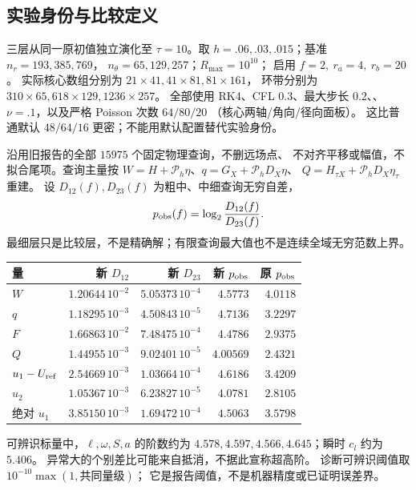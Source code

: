 \documentclass[UTF8,fontset=fandol,11pt,a4paper]{ctexart}
\newcommand{\code}[1]{\texttt{\detokenize{#1}}}
\newcommand{\Dx}{D_X}
\begin{document}
\subsection{实验身份与比较定义}
三层从同一原初值独立演化至 $\tau=10$。取
$h=.06,.03,.015$；基准 $n_r=193,385,769$，
$n_\theta=65,129,257$；$R_{\max}=10^{10}$；
启用 $f=2,\ r_a=4,\ r_b=20$。
实际核心数组分别为 $21\times41,41\times81,81\times161$，
环带分别为 $310\times65,618\times129,1236\times257$。
全部使用 RK4、CFL $0.3$、最大步长 $0.2$、\code{linear5}、
$\nu=.1$，以及严格 Poisson 次数 $64/80/20$
（核心两轴/角向/径向面板）。
这比普通默认 $48/64/16$ 更密；不能用默认配置替代实验身份。

沿用旧报告的全部 $15975$ 个固定物理查询，不删远场点、
不对齐平移或幅值，不拟合尾项。查询主量按
$W=H+\mathcal P_h\eta$、$q=G_X+\mathcal P_h\Dx\eta$、
$Q=H_{\tau X}+\mathcal P_h\Dx\eta_\tau$ 重建。
设 $D_{12}(f),D_{23}(f)$ 为粗中、中细查询无穷自差，
\begin{equation}
 p_{\rm obs}(f)=\log_2\frac{D_{12}(f)}{D_{23}(f)}.
\end{equation}
最细层只是比较层，不是精确解；有限查询最大值也不是连续全域无穷范数上界。

\begin{center}
\small
\begin{tabular}{lrrrr}
\toprule
量 & 新 $D_{12}$ & 新 $D_{23}$ & 新 $p_{\rm obs}$ & 原 $p_{\rm obs}$\\
\midrule
$W$ & $1.20644\,10^{-2}$ & $5.05373\,10^{-4}$ & $4.5773$ & $4.0118$\\
$q$ & $1.18295\,10^{-3}$ & $4.50843\,10^{-5}$ & $4.7136$ & $3.2297$\\
$F$ & $1.66863\,10^{-2}$ & $7.48475\,10^{-4}$ & $4.4786$ & $2.9375$\\
$Q$ & $1.44955\,10^{-3}$ & $9.02401\,10^{-5}$ & $4.00569$ & $2.4321$\\
$u_1-U_{\rm ref}$ & $2.54669\,10^{-3}$ & $1.03664\,10^{-4}$ & $4.6186$ & $3.4209$\\
$u_2$ & $1.05367\,10^{-3}$ & $6.23827\,10^{-5}$ & $4.0781$ & $2.8105$\\
绝对 $u_1$ & $3.85150\,10^{-3}$ & $1.69472\,10^{-4}$ & $4.5063$ & $3.5798$\\
\bottomrule
\end{tabular}
\end{center}
可辨识标量中，$\ell,\omega,S,a$ 的阶数约为
$4.578,4.597,4.566,4.645$；瞬时 $c_l$ 约为 $5.406$。
异常大的个别差比可能来自抵消，不据此宣称超高阶。
诊断可辨识阈值取 $10^{-10}\max(1,\text{共同量级})$；
它是报告阈值，不是机器精度或已证明误差界。
\end{document}

